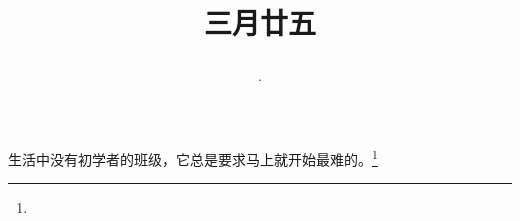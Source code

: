 \title{\date[d=3,m=5,y=2024][year:cn-y,年,month:cn,day:cn,日,·,weekday]·三月廿五 }
生活中没有初学者的班级，它总是要求马上就开始最难的。\footnote{ }

